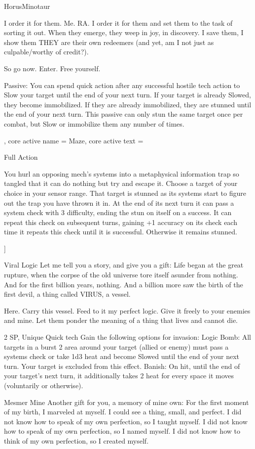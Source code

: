 \begin{mech}{Horus}{Minotaur}
{I order it for them. Me. RA. I order it for them and set them to the task of sorting it out. When they emerge, they weep in joy, in discovery. I save them, I show them THEY are their own redeemers (and yet, am I not just as culpable/worthy of credit?).

So go now. Enter. Free yourself.     


Passive: You can spend quick action after any successful hostile tech action to Slow your target until the end of your next turn. If your target is already Slowed, they become immobilized. If they are already immobilized, they are stunned until the end of your next turn. This passive can only stun the same target once per combat, but Slow or immobilize them any number of times.
},
core active name = Maze,
core active text = {Full Action

You hurl an opposing mech’s systems into a metaphysical information trap so tangled that it can do nothing but try and escape it. Choose a target of your choice in your sensor range. That target is stunned as its systems start to figure out the trap you have thrown it in. At the end of its next turn it can pass a system check with 3 difficulty, ending the stun on itself on a success. It can repeat this check on subsequent turns, gaining +1 accuracy on its check each time it repeats this check until it is successful. Otherwise it remains stunned.}]


Viral Logic
Let me tell you a story, and give you a gift: Life began at the great rupture, when the corpse of the old universe tore itself asunder from nothing. And for the first billion years, nothing. And a billion more saw the birth of the first devil, a thing called VIRUS, a vessel. 

Here. Carry this vessel. Feed to it my perfect logic. Give it freely to your enemies and mine. Let them ponder the meaning of a thing that lives and cannot die.  

2 SP, Unique
Quick tech
Gain the following options for invasion:
Logic Bomb: All targets in a burst 2 area around your target (allied or enemy) must pass a systems check or take 1d3 heat and become Slowed until the end of your next turn. Your target is excluded from this effect.
Banish: On hit, until the end of your target’s next turn, it additionally takes 2 heat for every space it moves (voluntarily or otherwise).

Mesmer Mine
Another gift for you, a memory of mine own: For the first moment of my birth, I marveled at myself. I could see a thing, small, and perfect. I did not know how to speak of my own perfection, so I taught myself. I did not know how to speak of my own perfection, so I named myself. I did not know how to think of my own perfection, so I created myself. 


\end{mech}
